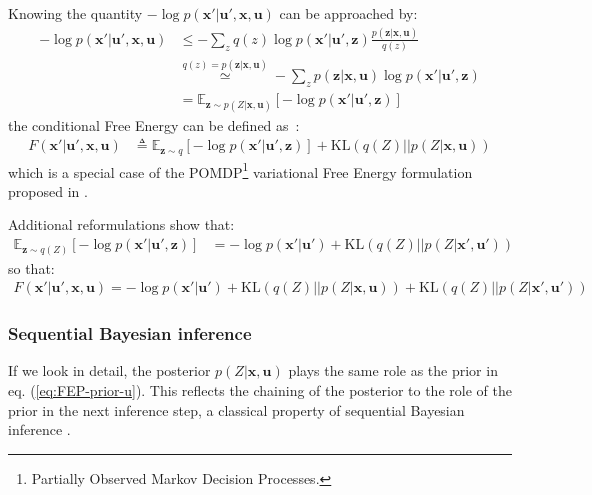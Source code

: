 \documentclass[12pt,twoside,openright]{article}
\begin{document}
Knowing the quantity $-\log p(\boldsymbol{x}'| \boldsymbol{u}', \boldsymbol{x}, \boldsymbol{u})$ can be approached by: 
\begin{align}
-\log p(\boldsymbol{x}'| \boldsymbol{u}', \boldsymbol{x}, \boldsymbol{u}) 
&\leq - \sum_z q(z) \log p(\boldsymbol{x}'| \boldsymbol{u}', \boldsymbol{z}) \frac{p(\boldsymbol{z} |\boldsymbol{x}, \boldsymbol{u})} {q(z)}  \nonumber\\
&\stackrel{q(z) = p(\boldsymbol{z} |\boldsymbol{x}, \boldsymbol{u})}{\simeq} 
- \sum_z p(\boldsymbol{z} |\boldsymbol{x}, \boldsymbol{u}) \log p(\boldsymbol{x}'| \boldsymbol{u}', \boldsymbol{z})  \nonumber\\
&= \mathbb{E}_{\boldsymbol{z} \sim p(Z |\boldsymbol{x}, \boldsymbol{u})} \left[-\log p(\boldsymbol{x}'| \boldsymbol{u}', \boldsymbol{z})\right] \label{eq:cond-F}
\end{align}
the conditional Free Energy can be defined as~:
\begin{align}
F(\boldsymbol{x}'|\boldsymbol{u}', \boldsymbol{x}, \boldsymbol{u}) 
&\triangleq \mathbb{E}_{\boldsymbol{z} \sim q} \left[-\log p(\boldsymbol{x}'| \boldsymbol{u}', \boldsymbol{z})\right] + \text{KL}(q(Z)||p(Z|\boldsymbol{x},\boldsymbol{u}))
\label{eq:FEP-uxu}
\end{align}
which is a special case of the POMDP\footnote{Partially Observed Markov Decision Processes.} variational Free Energy formulation proposed in \cite{friston2015active}.

Additional reformulations show that:
\begin{align}
\mathbb{E}_{\boldsymbol{z} \sim q(Z)} \left[-\log p(\boldsymbol{x}'| \boldsymbol{u}', \boldsymbol{z})\right]
&= -\log p(\boldsymbol{x}'|\boldsymbol{u}') + \text{KL}(q(Z)||p(Z|\boldsymbol{x}',\boldsymbol{u}'))\label{eq:cond-F-KL}
\end{align}
so that:
\begin{align}
F(\boldsymbol{x}'|\boldsymbol{u}', \boldsymbol{x}, \boldsymbol{u}) =  -\log p(\boldsymbol{x}'| \boldsymbol{u}') + \text{KL}(q(Z)||p(Z|\boldsymbol{x},\boldsymbol{u})) + \text{KL}(q(Z)||p(Z|\boldsymbol{x}',\boldsymbol{u}'))
\label{eq:FEP-uxu2}
\end{align}

\subsubsection{Sequential Bayesian inference}
If we look in detail, the posterior $p(Z|\boldsymbol{x},\boldsymbol{u})$ plays the same role as the prior in eq. (\ref{eq:FEP-prior-u}). This reflects the chaining of the posterior to the role of the prior in the next inference step, a classical property of sequential Bayesian inference \cite{wald1945sequential}.
\end{document}
